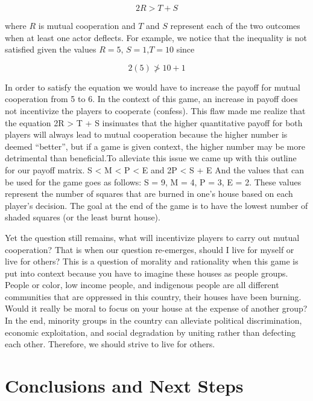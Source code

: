 \documentclass[12pt,twoside]{article}
\begin{document}
\begin{equation}
2R > T + S 
\end{equation}

where $R$ is mutual cooperation and $T$ and $S$ represent each of the two outcomes when at least one actor deflects. For example, we notice that the inequality is not satisfied given the values $R=5$, $S=1$,$T=10$ since

\begin{equation} 
2(5) \not> 10 + 1
\end{equation}

In order to satisfy the equation we would have to increase the payoff for mutual cooperation from 5 to 6. In the context of this game, an increase in payoff does not incentivize the players to cooperate (confess). This flaw made me realize that the equation 2R > T + S insinuates that the higher quantitative payoff for both players will always lead to mutual cooperation because the higher number is deemed “better”, but if a game is given context, the higher number may be more detrimental than beneficial.To alleviate this issue we came up with this outline for our payoff matrix. 
S < M < P < E and 2P < S + E
And the values that can be used for the game goes as follows: S = 9, M = 4, P = 3, E = 2. These values represent the number of squares that are burned in one's house based on each player's decision. The goal at the end of the game is to have the lowest number of shaded squares (or the least burnt house).  


Yet the question still remains, what will incentivize players to carry out mutual cooperation? That is when our question re-emerges, should I live for myself or live for others? This is a question of morality and rationality when this game is put into context because you have to imagine these houses as people groups. People or color, low income people, and indigenous people are all different communities that are oppressed in this country, their houses have been burning. Would it really be moral to focus on your house at the expense of another group? In the end, minority groups in the country can alleviate political discrimination, economic exploitation, and social degradation by uniting rather than defecting each other. Therefore, we should strive to live for others.


\section{Conclusions and Next Steps}
\end{document}
